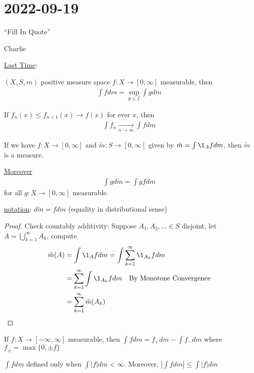 \section{2022-09-19}

\epigraph{``Fill In Quote''}{Charlie}

\underline{Last Time}:

$(X,S, m)$ positive measure space $f : X \to [0,\infty]$ measurable, then 
 \begin{align*}
\int f dm = \sup_{g \leq f} \int g dm
\end{align*} 


\begin{theorem}
	If $f_n(x) \leq f_{n+1}(x) \to f(x)$ for ever $x$, then 
	\begin{align*}
		\int f_n \xrightarrow[n \to \infty]{} \int f dm
	\end{align*} 
\end{theorem}

\begin{corollary}
	If we have $f: X \to [0,\infty]$ and $\tilde{m} : S \to [0,\infty]$ given by $\tilde{m} = \int \1_A fdm$, then $\tilde{m}$ is a measure.

	\underline{Moreover}
	\begin{align*}
		\int g d\tilde{m} = \int g f dm
	\end{align*} for all $g :X \to [0,\infty]$ measurable.

	\underline{notation}:
	$d \tilde{m} = f dm$ (equality in distributional sense)
\end{corollary}

\begin{proof}
	Check countably additivity:
	Suppose $A_1, A_2, \ldots \in S$ disjoint, let  $A = \bigcup_{k=1}^{\infty} A_k$, compute 
	\begin{align*}
		\tilde{m}(A) &= \int \1_{A} f dm
					 = \int \sum_{k=1}^{\infty} \1_{A_k} f dm \\
					 &= \sum_{k=1}^{\infty} \int \1_{A_k} f dm \quad \text{By Monotone Convergence} \\
					 &=  \sum_{k=1}^{\infty} \tilde{m}( A_k )
	\end{align*}
\end{proof}

\begin{definition}
	If $f: X \to [ - \infty, \infty]$ measurable, then  $\int f dm = f_{+} dm - \int f_{-} dm$ where
	$f_{\pm} = \max\{0, \pm f\}$
\begin{remark}
	$\int f dm$ defined only when $\int |f| dm < \infty$. Moreover,  $|\int f dm | \leq \int |f| dm$
\end{remark}
\end{definition}

